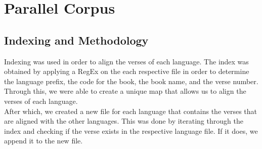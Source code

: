 \documentclass{article}
\begin{document}
\section{Parallel Corpus}

\subsection{Indexing and Methodology}

Indexing was used in order to align the verses of each language. The index was
obtained by applying a RegEx on the each respective file in order to determine
the language prefix, the code for the book, the book name, and the verse
number. Through this, we were able to create a unique map that allows us to
align the verses of each language.\\

After which, we created a new file for each language that contains the verses
that are aligned with the other languages. This was done by iterating through
the index and checking if the verse exists in the respective language file. If
it does, we append it to the new file.\\



\end{document}

